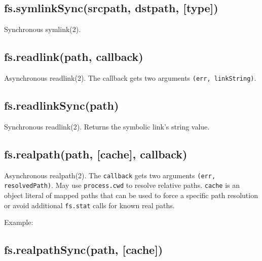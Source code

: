 \subsection{fs.symlinkSync(srcpath, dstpath,
{[}type{]})}\label{fs.symlinksyncsrcpath-dstpath-type}

Synchronous symlink(2).

\subsection{fs.readlink(path, callback)}\label{fs.readlinkpath-callback}

Asynchronous readlink(2). The callback gets two arguments
\texttt{(err, linkString)}.

\subsection{fs.readlinkSync(path)}\label{fs.readlinksyncpath}

Synchronous readlink(2). Returns the symbolic link's string value.

\subsection{fs.realpath(path, {[}cache{]},
callback)}\label{fs.realpathpath-cache-callback}

Asynchronous realpath(2). The \texttt{callback} gets two arguments
\texttt{(err, resolvedPath)}. May use \texttt{process.cwd} to resolve
relative paths. \texttt{cache} is an object literal of mapped paths that
can be used to force a specific path resolution or avoid additional
\texttt{fs.stat} calls for known real paths.

Example:

\begin{Shaded}
\begin{Highlighting}[]
 \NormalTok{:}\NormalTok{\};}
\NormalTok{(} 
    
\NormalTok{\});}
\end{Highlighting}
\end{Shaded}

\subsection{fs.realpathSync(path,
{[}cache{]})}\label{fs.realpathsyncpath-cache}

